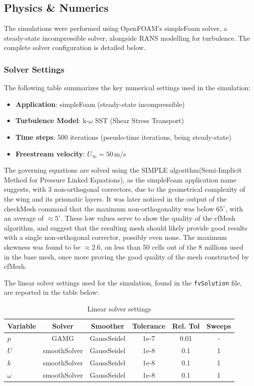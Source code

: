 \documentclass[12pt,a4paper]{article}
\begin{document}
\subsection{Physics \& Numerics}

The simulations were performed using OpenFOAM's simpleFoam solver, a steady-state incompressible solver, alongside RANS modelling for turbulence. The complete solver configuration is detailed below.

\subsubsection{Solver Settings}

The following table summarizes the key numerical settings used in the simulation:

\begin{itemize}
    \item \textbf{Application}: simpleFoam (steady-state incompressible)
    \item \textbf{Turbulence Model}: k-$\omega$ SST (Shear Stress Transport)
    \item \textbf{Time steps}: 500 iterations (pseudo-time iterations, being steady-state)
    \item \textbf{Freestream velocity}: $U_{\infty} = 50$\,m/s
\end{itemize}

The governing equations are solved using the SIMPLE algorithm(Semi-Implicit Method for Pressure Linked Equations), as the simpleFoam application name suggests, with 3 non-orthogonal correctors, due to the geometrical complexity of the wing and its prismatic layers. It was later noticed in the output of the checkMesh command that the maximum non-orthogonality was below $65^\circ$, with an average of $\approx5^\circ$. These low values serve to show the quality of the cfMesh algorithm, and suggest that the resulting mesh should likely provide good results with a single non-orthogonal corrector, possibly even none. The maximum skewness was found to be $\approx2.6$, on less than 50 cells out of the 8 millions used in the base mesh, once more proving the good quality of the mesh constructed by cfMesh.

The linear solver settings used for the simulation, found in the \texttt{fvSolution} file, are reported in the table below:

\begin{table}[H]
\centering
\label{tab:solvers}
\begin{tabular}{@{}lccccc@{}}
\toprule
\textbf{Variable} & \textbf{Solver} & \textbf{Smoother} & \textbf{Tolerance} & \textbf{Rel. Tol} & \textbf{Sweeps} \\
\midrule
$p$ & GAMG & GaussSeidel & 1e-7 & 0.01 & - \\
$U$ & smoothSolver & GaussSeidel & 1e-8 & 0.1 & 1 \\
$k$ & smoothSolver & GaussSeidel & 1e-8 & 0.1 & 1 \\
$\omega$ & smoothSolver & GaussSeidel & 1e-8 & 0.1 & 1 \\
\bottomrule
\end{tabular}
\caption{Linear solver settings}
\end{table}
\end{document}
